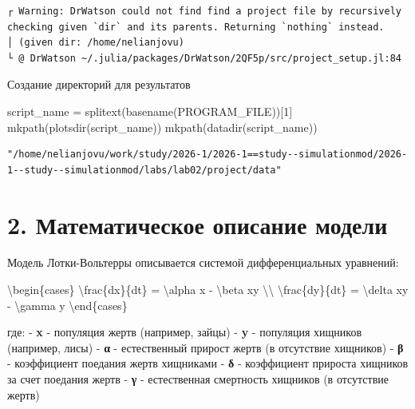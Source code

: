 \documentclass[
  12pt,
  a4paper,
  DIV=11,
  numbers=noendperiod]{scrreprt}
\newenvironment{Shaded}{\begin{snugshade}}{\end{snugshade}}
\newcommand{\ConstantTok}[1]{\textcolor[rgb]{0.56,0.35,0.01}{#1}}
\newcommand{\FloatTok}[1]{\textcolor[rgb]{0.68,0.00,0.00}{#1}}
\newcommand{\FunctionTok}[1]{\textcolor[rgb]{0.28,0.35,0.67}{#1}}
\newcommand{\NormalTok}[1]{\textcolor[rgb]{0.00,0.23,0.31}{#1}}
\newcommand{\OperatorTok}[1]{\textcolor[rgb]{0.37,0.37,0.37}{#1}}
\begin{document}
\begin{verbatim}
┌ Warning: DrWatson could not find find a project file by recursively checking given `dir` and its parents. Returning `nothing` instead.
│ (given dir: /home/nelianjovu)
└ @ DrWatson ~/.julia/packages/DrWatson/2QF5p/src/project_setup.jl:84
\end{verbatim}

Создание директорий для результатов

\begin{Shaded}
\begin{Highlighting}[]
\NormalTok{script\_name }\OperatorTok{=} \FunctionTok{splitext}\NormalTok{(}\FunctionTok{basename}\NormalTok{(}\ConstantTok{PROGRAM\_FILE}\NormalTok{))[}\FloatTok{1}\NormalTok{]}
\FunctionTok{mkpath}\NormalTok{(}\FunctionTok{plotsdir}\NormalTok{(script\_name))}
\FunctionTok{mkpath}\NormalTok{(}\FunctionTok{datadir}\NormalTok{(script\_name))}
\end{Highlighting}
\end{Shaded}

\begin{verbatim}
"/home/nelianjovu/work/study/2026-1/2026-1==study--simulationmod/2026-1--study--simulationmod/labs/lab02/project/data"
\end{verbatim}

\section{2. Математическое описание
модели}\label{ux43cux430ux442ux435ux43cux430ux442ux438ux447ux435ux441ux43aux43eux435-ux43eux43fux438ux441ux430ux43dux438ux435-ux43cux43eux434ux435ux43bux438}

Модель Лотки-Вольтерры описывается системой дифференциальных уравнений:

\begin{Shaded}
\begin{Highlighting}[]
\NormalTok{\textbackslash{}begin\{cases\}}
\NormalTok{\textbackslash{}frac\{dx\}\{dt\} = \textbackslash{}alpha x {-} \textbackslash{}beta xy \textbackslash{}\textbackslash{}}
\NormalTok{\textbackslash{}frac\{dy\}\{dt\} = \textbackslash{}delta xy {-} \textbackslash{}gamma y}
\NormalTok{\textbackslash{}end\{cases\}}
\end{Highlighting}
\end{Shaded}

где: - \textbf{x} - популяция жертв (например, зайцы) - \textbf{y} -
популяция хищников (например, лисы) - \textbf{α} - естественный прирост
жертв (в отсутствие хищников) - \textbf{β} - коэффициент поедания жертв
хищниками - \textbf{δ} - коэффициент прироста хищников за счет поедания
жертв - \textbf{γ} - естественная смертность хищников (в отсутствие
жертв)
\end{document}
